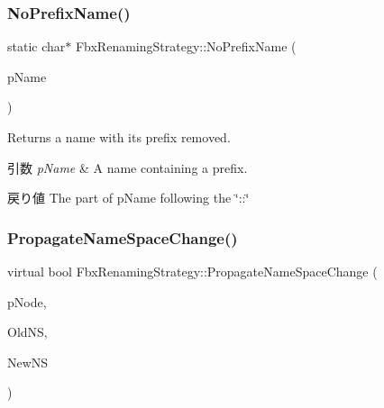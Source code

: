 \subsubsection{\texorpdfstring{No\+Prefix\+Name()}{NoPrefixName()}\hspace{0.1cm}{\footnotesize\ttfamily [2/2]}}
{\footnotesize\ttfamily static char$\ast$ Fbx\+Renaming\+Strategy\+::\+No\+Prefix\+Name (\begin{DoxyParamCaption}\item[{\hyperlink{class_fbx_string}{Fbx\+String} \&}]{p\+Name }\end{DoxyParamCaption})\hspace{0.3cm}{\ttfamily [static]}}

Returns a name with its prefix removed. 
\begin{DoxyParams}{引数}
{\em p\+Name} & A name containing a prefix. \\
\hline
\end{DoxyParams}
\begin{DoxyReturn}{戻り値}
The part of p\+Name following the \char`\"{}\+::\char`\"{} 
\end{DoxyReturn}
\mbox{\label{class_fbx_renaming_strategy_a7d9e1c1bd9ffb573a54cafbfe138f837}} 
\subsubsection{\texorpdfstring{Propagate\+Name\+Space\+Change()}{PropagateNameSpaceChange()}}
{\footnotesize\ttfamily virtual bool Fbx\+Renaming\+Strategy\+::\+Propagate\+Name\+Space\+Change (\begin{DoxyParamCaption}\item[{\hyperlink{class_fbx_node}{Fbx\+Node} $\ast$}]{p\+Node,  }\item[{\hyperlink{class_fbx_string}{Fbx\+String}}]{Old\+NS,  }\item[{\hyperlink{class_fbx_string}{Fbx\+String}}]{New\+NS }\end{DoxyParamCaption})\hspace{0.3cm}{\ttfamily [virtual]}}

